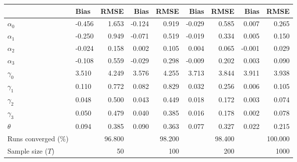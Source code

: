 
\begin{tabular}[t]{llrrrrrrr}
\toprule
  & Bias & RMSE & Bias & RMSE & Bias & RMSE & Bias & RMSE\\
\midrule
$\alpha_{0}$ & -0.456 & 1.653 & -0.124 & 0.919 & -0.029 & 0.585 & 0.007 & 0.265\\
$\alpha_{1}$ & -0.250 & 0.949 & -0.071 & 0.519 & -0.019 & 0.334 & 0.005 & 0.150\\
$\alpha_{2}$ & -0.024 & 0.158 & 0.002 & 0.105 & 0.004 & 0.065 & -0.001 & 0.029\\
$\alpha_{3}$ & -0.108 & 0.559 & -0.029 & 0.298 & -0.009 & 0.202 & 0.003 & 0.090\\
$\gamma_{0}$ & 3.510 & 4.249 & 3.576 & 4.255 & 3.713 & 3.844 & 3.911 & 3.938\\
$\gamma_{1}$ & 0.110 & 0.772 & 0.082 & 0.829 & 0.032 & 0.256 & 0.006 & 0.105\\
$\gamma_{2}$ & 0.048 & 0.500 & 0.043 & 0.449 & 0.018 & 0.172 & 0.003 & 0.074\\
$\gamma_{3}$ & 0.050 & 0.479 & 0.040 & 0.385 & 0.016 & 0.178 & 0.002 & 0.078\\
$\theta$ & 0.094 & 0.385 & 0.090 & 0.363 & 0.077 & 0.327 & 0.022 & 0.215\\
Runs converged (\%) &  & 96.800 &  & 98.200 &  & 98.400 &  & 100.000\\
Sample size ($T$) &  & 50 &  & 100 &  & 200 &  & 1000\\
\bottomrule
\end{tabular}
